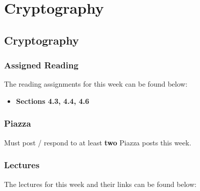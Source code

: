\clearpage

\renewcommand{\ChapTitle}{Cryptography}
\renewcommand{\SectionTitle}{Cryptography}

\chapter{\ChapTitle}
\section{\SectionTitle}

\subsection{Assigned Reading}

The reading assignments for this week can be found below:

\begin{itemize}
    \item \textbf{Sections 4.3, 4.4, 4.6}
\end{itemize}

\subsection{Piazza}

Must post / respond to at least \textbf{two} Piazza posts this week.  

\subsection{Lectures}

The lectures for this week and their links can be found below:


